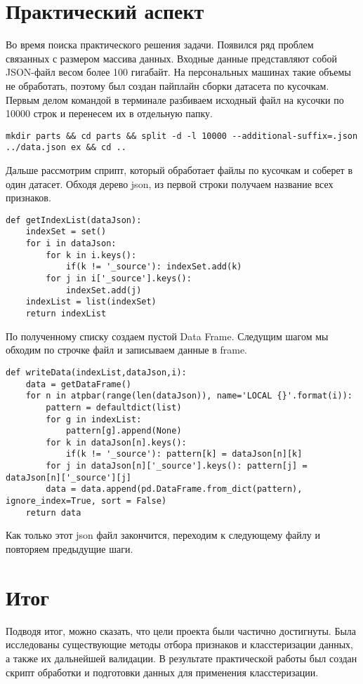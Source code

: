 \documentclass[a4paper]{article}
\begin{document}
\section{Практический аспект}
Во время поиска практического решения задачи. Появился ряд проблем связанных с размером массива данных. Входные данные представляют собой JSON-файл весом более 100 гигабайт. На персональных машинах такие объемы не обработать, поэтому был создан пайплайн сборки датасета по кусочкам. \\
Первым делом командой в терминале разбиваем исходный файл на кусочки по 10000 строк и перенесем их в отдельную папку. 
\begin{lstlisting}
mkdir parts && cd parts && split -d -l 10000 --additional-suffix=.json ../data.json ex && cd ..
\end{lstlisting}
Дальше рассмотрим сприпт, который обработает файлы по кусочкам и соберет в один датасет. Обходя дерево json, из первой строки получаем название всех признаков.
\begin{lstlisting}
def getIndexList(dataJson):
	indexSet = set()
	for i in dataJson:
		for k in i.keys():
			if(k != '_source'): indexSet.add(k)
		for j in i['_source'].keys():
			indexSet.add(j)
	indexList = list(indexSet)
	return indexList
\end{lstlisting}
По полученному списку создаем пустой Data Frame. Следущим шагом мы обходим по строчке файл и записываем данные в frame.
\begin{lstlisting}
def writeData(indexList,dataJson,i):
	data = getDataFrame()
	for n in atpbar(range(len(dataJson)), name='LOCAL {}'.format(i)):
		pattern = defaultdict(list)
		for g in indexList: 
			pattern[g].append(None)
		for k in dataJson[n].keys():
			if(k != '_source'): pattern[k] = dataJson[n][k]
		for j in dataJson[n]['_source'].keys(): pattern[j] = dataJson[n]['_source'][j]
		data = data.append(pd.DataFrame.from_dict(pattern), ignore_index=True, sort = False)
	return data
\end{lstlisting}
Как только этот json файл закончится, переходим к следующему файлу и повторяем предыдущие шаги.


\newpage
\section{Итог}
Подводя итог, можно сказать, что цели проекта были частично достигнуты. Была исследованы существующие методы отбора признаков и класстеризации данных, а также их дальнейшей валидации. В результате практической работы был создан скрипт обработки и подготовки данных для применения класстеризации. \\
\end{document}
